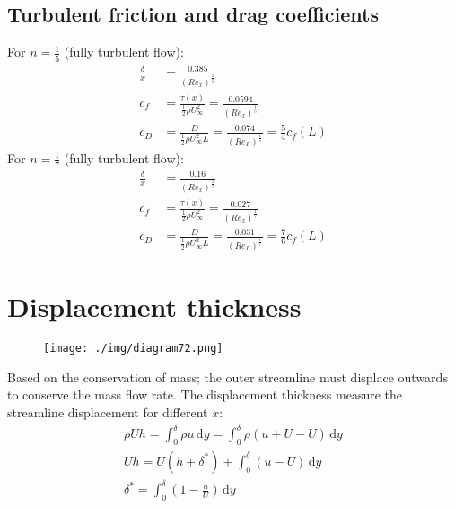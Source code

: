 \subsection{Turbulent friction and drag coefficients}
For $n = \frac{1}{5}$ (fully turbulent flow):
\begin{align}
  \frac{\delta}{x} & = \frac{0.385}{(Re_x)^{\frac{1}{5}}}                                                                 \\
  c_f              & = \frac{\tau (x)}{\frac{1}{2}\rho U_\infty^2} = \frac{0.0594}{(Re_x)^\frac{1}{5}}                    \\
  c_D              & = \frac{D}{\frac{1}{2} \rho U_\infty^2 L} = \frac{0.074}{(Re_L)^{\frac{1}{5}}} = \frac{5}{4} c_f (L)
\end{align}
For $n = \frac{1}{7}$ (fully turbulent flow):
\begin{align}
  \frac{\delta}{x} & = \frac{0.16}{(Re_x)^{\frac{1}{7}}}                                                                 \\
  c_f              & = \frac{\tau (x)}{\frac{1}{2} \rho U_\infty^2} = \frac{0.027}{(Re_x)^{\frac{1}{7}}}                 \\
  c_D              & = \frac{D}{\frac{1}{2}\rho U_\infty^2 L} = \frac{0.031}{(Re_L)^{\frac{1}{7}}} = \frac{7}{6} c_f (L)
\end{align}
\section{Displacement thickness}
\begin{figure}[H]
  \centering
  \texttt{[image: ./img/diagram72.png]}
\end{figure}
Based on the conservation of mass; the outer streamline must displace outwards to conserve the mass flow rate. The displacement thickness measure the streamline displacement for different $x$:
\begin{gather}
  \rho U h = \int_{0}^{\delta} \rho u \,\mathrm{d}y = \int_{0}^{\delta} \rho \left(u + U - U\right) \,\mathrm{d}y\\
  Uh = U(h + \delta^*) + \int_{0}^{\delta} \left(u - U\right) \,\mathrm{d}y\\
  \delta^* = \int_{0}^{\delta} \left(1 - \frac{u}{U}\right) \,\mathrm{d}y
\end{gather}
